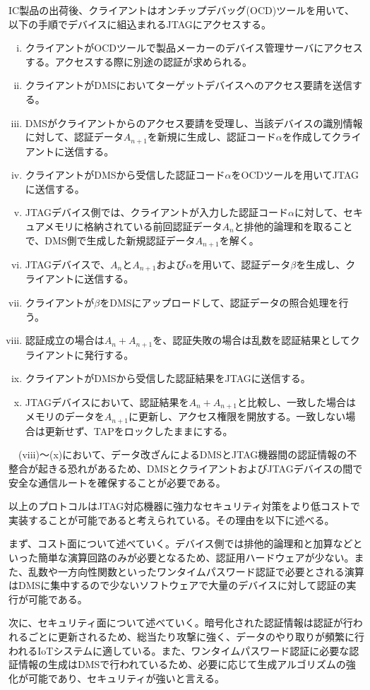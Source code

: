 \documentclass{thesis}
\begin{document}
IC製品の出荷後、クライアントはオンチップデバッグ(OCD)ツールを用いて、以下の手順でデバイスに組込まれるJTAGにアクセスする。
\begin{enumerate}[(i)]
\item クライアントがOCDツールで製品メーカーのデバイス管理サーバにアクセスする。アクセスする際に別途の認証が求められる。
\item クライアントがDMSにおいてターゲットデバイスへのアクセス要請を送信する。
\item DMSがクライアントからのアクセス要請を受理し、当該デバイスの識別情報に対して、認証データ$A_{n+1}$を新規に生成し、認証コード$\alpha$を作成してクライアントに送信する。
\item クライアントがDMSから受信した認証コード$\alpha$をOCDツールを用いてJTAGに送信する。
\item JTAGデバイス側では、クライアントが入力した認証コード$\alpha$に対して、セキュアメモリに格納されている前回認証データ$A_n$と排他的論理和を取ることで、DMS側で生成した新規認証データ$A_{n+1}$を解く。
\item JTAGデバイスで、$A_n$と$A_{n+1}$および$\alpha$を用いて、認証データ$\beta$を生成し、クライアントに送信する。
\item クライアントが$\beta$をDMSにアップロードして、認証データの照合処理を行う。
\item 認証成立の場合は$A_n+A_{n+1}$を、認証失敗の場合は乱数を認証結果としてクライアントに発行する。
\item クライアントがDMSから受信した認証結果をJTAGに送信する。
\item JTAGデバイスにおいて、認証結果を$A_{n}+A_{n+1}$と比較し、一致した場合はメモリのデータを$A_{n+1}$に更新し、アクセス権限を開放する。一致しない場合は更新せず、TAPをロックしたままにする。
\end{enumerate}
　(viii)～(x)において、データ改ざんによるDMSとJTAG機器間の認証情報の不整合が起きる恐れがあるため、DMSとクライアントおよびJTAGデバイスの間で安全な通信ルートを確保することが必要である。\par
以上のプロトコルはJTAG対応機器に強力なセキュリティ対策をより低コストで実装することが可能であると考えられている。その理由を以下に述べる。\par
まず、コスト面について述べていく。デバイス側では排他的論理和と加算などといった簡単な演算回路のみが必要となるため、認証用ハードウェアが少ない。また、乱数や一方向性関数といったワンタイムパスワード認証で必要とされる演算はDMSに集中するので少ないソフトウェアで大量のデバイスに対して認証の実行が可能である。\par
次に、セキュリティ面について述べていく。暗号化された認証情報は認証が行われるごとに更新されるため、総当たり攻撃に強く、データのやり取りが頻繁に行われるIoTシステムに適している。また、ワンタイムパスワード認証に必要な認証情報の生成はDMSで行われているため、必要に応じて生成アルゴリズムの強化が可能であり、セキュリティが強いと言える。\cite{JTAG認証機構}
\end{document}
